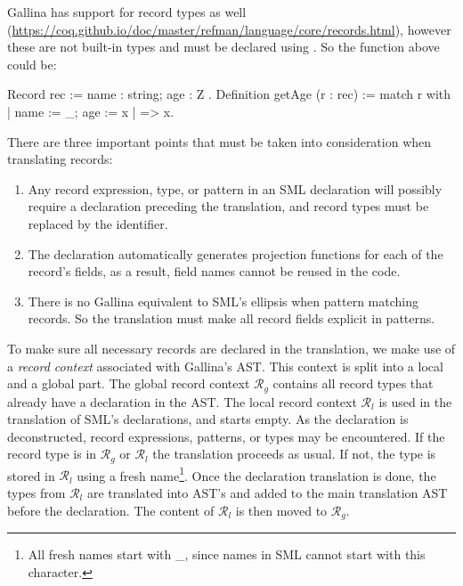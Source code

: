 \documentclass[a4paper,11pt]{article}
\begin{document}
Gallina has support for record types as well
(\url{https://coq.github.io/doc/master/refman/language/core/records.html}),
however these are not built-in types and must be declared using
. So the  function above could be:

\begin{coq}
Record rec := { name : string; age : Z }.
Definition getAge (r : rec) := match r with 
  {| name := _; age := x |} => x.
\end{coq}

There are three important points that must be taken into consideration
when translating records:

\begin{enumerate}
  \item Any record expression, type, or pattern in an SML declaration
  will possibly require a  declaration preceding the
  translation, and record types must be replaced by the 
  identifier.

  \item The  declaration automatically generates
  projection functions for each of the record's fields, as a result,
  field names cannot be reused in the code.

  \item There is no Gallina equivalent to SML's ellipsis when pattern
  matching records. So the translation must make all record fields
  explicit in patterns.
\end{enumerate}

To make sure all necessary records are declared in the translation, we
make use of a \emph{record context} associated with Gallina's AST.
This context is split into a local and a global part. The global
record context $\mathcal{R}_g$ contains all record types that already
have a declaration in the AST. The local record context
$\mathcal{R}_l$ is used in the translation of SML's declarations, and
starts empty. As the declaration is deconstructed, record expressions,
patterns, or types may be encountered. If the record type is in
$\mathcal{R}_g$ or $\mathcal{R}_l$ the translation proceeds as usual.
If not, the type is stored in $\mathcal{R}_l$ using a fresh
name\footnote{All fresh names start with \_, since names in SML cannot
start with this character.}. Once
the declaration translation is done, the types from $\mathcal{R}_l$
are translated into  AST's and added to the main
translation AST before the declaration. The content of $\mathcal{R}_l$
is then moved to $\mathcal{R}_g$.
\end{document}
